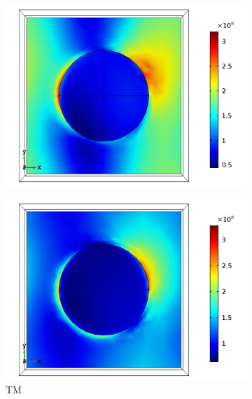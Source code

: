 \begin{figure}[htb!]
    \begin{subfigure}{0.32\textwidth}
        \centering
        \includegraphics[width=\linewidth]{figures/ch4/S5A/FieldDistribution/phi25/Sample5A_TM_Slice@z=0_wl=350_phi=25.png}
   \end{subfigure}
   \begin{subfigure}{0.32\textwidth}
        \centering
        \includegraphics[width=\linewidth]{figures/ch4/S5A/FieldDistribution/phi25/Sample5A_TM_Slice@z=0_wl=400_phi=25.png}
        \caption{TM}
        \vspace{-0.7cm}
   \end{subfigure}
   \begin{subfigure}{0.32\textwidth}

\end{subfigure}
\end{figure}
